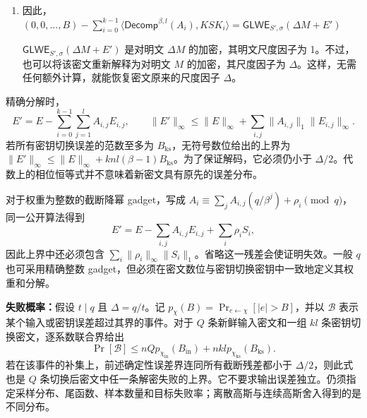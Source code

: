 \begin{myproof}
\begin{enumerate}
$= B - \sum\limits_{i=0}^{k-1} A_iS_i - \sum\limits_{i=0}^{k-1}E_i$

$= \Delta M + E - \sum\limits_{i=0}^{k-1}E_i $

$= \Delta M + E'$ \textcolor{red}{ $\rhd$ 其中 $E' = E - \sum\limits_{i=0}^{k-1}E_i$}

严格来说，$B - \sum\limits_{i=0}^{k-1} A_iS_i = \Delta M + E + Kq$，其中 $K$ 是一个多项式，以 $q$ 的倍数表示系数回绕的量。不过，上述所有运算均在模 $q$ 下进行，因此 $Kq$ 项会被消去。

$ $

\item 因此，$ (0, 0, \ldots , B) - \sum \limits_{i=0}^{k-1} \langle \textsf{Decomp}^{\beta, l}(A_i), \mathit{KSK}_i \rangle = \textsf{GLWE}_{S',\sigma}(\Delta M + E') $

$\textsf{GLWE}_{S',\sigma}(\Delta M + E')$ 是对明文 $\Delta M$ 的加密，其明文尺度因子为 1。不过，也可以将该密文重新解释为对明文 $M$ 的加密，其尺度因子为 $\Delta$。这样，无需任何额外计算，就能恢复密文原来的尺度因子 $\Delta$。
\end{enumerate}
\end{myproof}


精确分解时，
\[
E'=E-\sum_{i=0}^{k-1}\sum_{j=1}^l A_{i,j}E_{i,j},\qquad
\|E'\|_\infty\le\|E\|_\infty+\sum_{i,j}\|A_{i,j}\|_1\|E_{i,j}\|_\infty.
\]
若所有密钥切换误差的范数至多为 $B_{\mathrm{ks}}$，无符号数位给出的上界为 $\|E'\|_\infty\le\|E\|_\infty+knl(\beta-1)B_{\mathrm{ks}}$。为了保证解码，它必须仍小于 $\Delta/2$。代数上的相位恒等式并不意味着新密文具有原先的误差分布。

对于权重为整数的截断降幂 gadget，写成 $A_i\equiv\sum_jA_{i,j}(q/\beta^j)+\rho_i\pmod q$，同一公开算法得到
\[
E'=E-\sum_{i,j}A_{i,j}E_{i,j}+\sum_i\rho_iS_i,
\]
因此上界中还必须包含 $\sum_i\|\rho_i\|_\infty\|S_i\|_1$。省略这一残差会使证明失效。一般 $q$ 也可采用精确整数 gadget，但必须在密文数位与密钥切换密钥中一致地定义其权重和分解。

\noindent\textbf{失败概率：}假设 $t\mid q$ 且 $\Delta=q/t$。记 $p_\chi(B)=\Pr_{e\leftarrow\chi}[|e|>B]$，并以 $\mathcal B$ 表示某个输入或密钥误差超过其界的事件。对于 $Q$ 条新鲜输入密文和一组 $kl$ 条密钥切换密文，逐系数联合界给出
\[
\Pr[\mathcal B]
\le nQp_{\chi_{\mathrm{in}}}(B_{\mathrm{in}})+nklp_{\chi_{\mathrm{ks}}}(B_{\mathrm{ks}}).
\]
若在该事件的补集上，前述确定性误差界连同所有截断残差都小于 $\Delta/2$，则此式也是 $Q$ 条切换后密文中任一条解密失败的上界。它不要求输出误差独立。仍须指定采样分布、尾函数、样本数量和目标失败率；离散高斯与连续高斯舍入得到的是不同分布。

